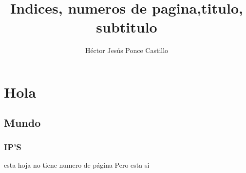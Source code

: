 \documentclass[11pt,letterpaper]{article}
\author{Héctor Jesús Ponce Castillo}
\title{Indices, numeros de pagina,titulo, subtitulo}
\begin{document}

\section{Hola}
\subsection{Mundo}
\subsubsection{IP'S}

\newpage


%
esta hoja no tiene numero de página
\thispagestyle{empty}
\newpage
Pero esta si
\end{document}
